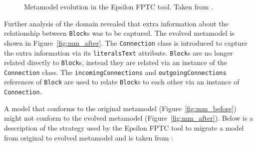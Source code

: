 \begin{figure}[htbp]
	\centering
	\caption[Metamodel evolution in the Epsilon FPTC tool]{Metamodel evolution in the Epsilon FPTC tool. Taken from \cite{rose09analysis}.}
\label{fig:fptc_mm}
\end{figure}

Further analysis of the domain revealed that extra information about the relationship between \texttt{Block}s was to be captured. The evolved metamodel is shown in Figure~\ref{fig:mm_after}. The \texttt{Co\-nn\-ec\-ti\-on} class is introduced to capture the extra information via its \texttt{li\-te\-ra\-lsTe\-xt} attribute. \texttt{Block}s are no longer related directly to \texttt{Bl\-o\-ck}s, instead they are related via an instance of the \texttt{Co\-nn\-ec\-ti\-on} class. The \texttt{in\-com\-i\-ngCo\-nn\-ec\-ti\-o\-ns} and \texttt{ou\-tgo\-i\-ngCo\-nn\-ec\-ti\-o\-ns} references of \texttt{Bl\-o\-ck} are used to relate \texttt{Bl\-o\-ck}s to each other via an instance of \texttt{Co\-nn\-ec\-ti\-on}.

A model that conforms to the original metamodel (Figure~\ref{fig:mm_before}) might not conform to the evolved metamodel (Figure~\ref{fig:mm_after}). Below is a description of the strategy used by the Epsilon FPTC tool to migrate a model from original to evolved metamodel and is taken from \cite{rose09analysis}:

